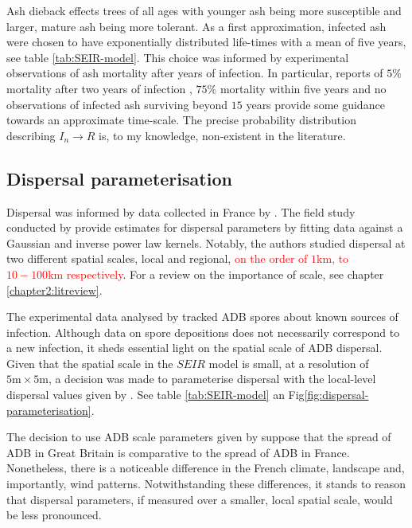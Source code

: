 Ash dieback effects trees of all ages with younger ash being more susceptible and larger, mature ash being more tolerant. 
As a first approximation, infected ash were chosen to have exponentially distributed life-times with a mean of five years, see table \ref{tab:SEIR-model}.
This choice was informed by experimental observations of ash mortality after years of infection. 
In particular, reports of $5\%$ mortality after two years of infection \cite{kessler2012dieback}, $75\%$ mortality within five years \cite{langer2015ash}  %
and no observations of infected ash surviving beyond $15$ years \cite{wylder2018evidence} provide some guidance towards an approximate time-scale.
The precise probability distribution describing $I_{n}\rightarrow R$ is, to my knowledge, non-existent in the literature. 

\subsection{Dispersal parameterisation}

Dispersal was informed by data collected in France by \cite{grosdidier2018tracking}. The field study conducted by \cite{grosdidier2018tracking} provide estimates for dispersal parameters by fitting data against a Gaussian and inverse power law kernels. Notably, the authors studied dispersal at two different spatial scales, local and regional, \textcolor{red}{on the order of $1\mathrm{km}$, to $10-100 \mathrm{km}$ respectively}. For a review on the importance of scale, see chapter \ref{chapter2:litreview}. 

The experimental data analysed by \cite{grosdidier2018tracking} tracked ADB spores about known sources of infection. Although data on spore depositions does not necessarily correspond to a new infection, it sheds essential light on the spatial scale of ADB dispersal. Given that the spatial scale in the $SEIR$ model is small, at a  resolution of $5\mathrm{m} \times 5\mathrm{m}$, a decision was made to parameterise dispersal with the local-level dispersal values given by \cite{grosdidier2018tracking}. See table \ref{tab:SEIR-model} an Fig\ref{fig:dispersal-parameterisation}. 

The decision to use ADB scale parameters given by \cite{grosdidier2018tracking} suppose that the spread of ADB in Great Britain is comparative to the spread of ADB in France. Nonetheless, there is a noticeable difference in the French climate, landscape and, importantly, wind patterns. %
Notwithstanding these differences, it stands to reason that dispersal parameters, if measured over a smaller, local spatial scale, would be less pronounced. 

